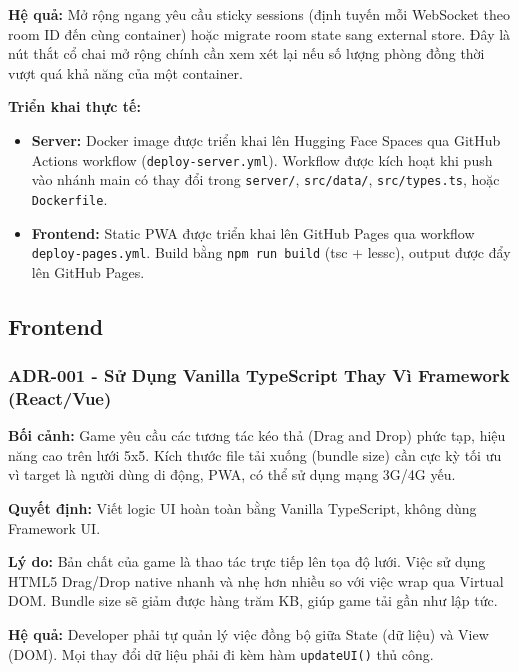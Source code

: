 \textbf{Hệ quả:} Mở rộng ngang yêu cầu sticky sessions (định tuyến mỗi WebSocket theo room ID đến cùng container) hoặc migrate room state sang external store. Đây là nút thắt cổ chai mở rộng chính cần xem xét lại nếu số lượng phòng đồng thời vượt quá khả năng của một container.

\textbf{Triển khai thực tế:}

\begin{itemize}[topsep=0pt, itemsep=2.5pt, leftmargin=1.5cm]
    \item \textbf{Server:} Docker image được triển khai lên Hugging Face Spaces qua GitHub Actions workflow (\texttt{deploy-server.yml}). Workflow được kích hoạt khi push vào nhánh main có thay đổi trong \texttt{server/}, \texttt{src/data/}, \texttt{src/types.ts}, hoặc \texttt{Dockerfile}.
    \item \textbf{Frontend:} Static PWA được triển khai lên GitHub Pages qua workflow \texttt{deploy-pages.yml}. Build bằng \texttt{npm run build} (tsc + lessc), output được đẩy lên GitHub Pages.
\end{itemize}

\subsection{Frontend}

\subsubsection*{ADR-001 - Sử Dụng Vanilla TypeScript Thay Vì Framework (React/Vue)}

\textbf{Bối cảnh:} Game yêu cầu các tương tác kéo thả (Drag and Drop) phức tạp, hiệu năng cao trên lưới 5x5. Kích thước file tải xuống (bundle size) cần cực kỳ tối ưu vì target là người dùng di động, PWA, có thể sử dụng mạng 3G/4G yếu.

\textbf{Quyết định:} Viết logic UI hoàn toàn bằng Vanilla TypeScript, không dùng Framework UI.

\textbf{Lý do:} Bản chất của game là thao tác trực tiếp lên tọa độ lưới. Việc sử dụng HTML5 Drag/Drop native nhanh và nhẹ hơn nhiều so với việc wrap qua Virtual DOM. Bundle size sẽ giảm được hàng trăm KB, giúp game tải gần như lập tức.

\textbf{Hệ quả:} Developer phải tự quản lý việc đồng bộ giữa State (dữ liệu) và View (DOM). Mọi thay đổi dữ liệu phải đi kèm hàm \texttt{updateUI()} thủ công.



